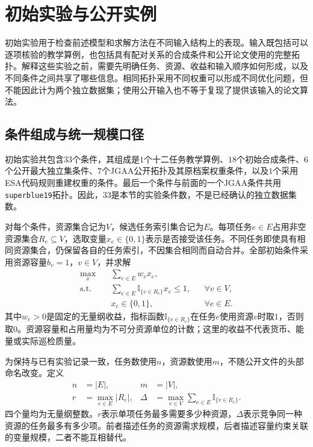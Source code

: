 \section{初始实验与公开实例}
\label{sec:03_05}

初始实验用于检查前述模型和求解方法在不同输入结构上的表现。输入既包括可以逐项核验的教学算例，也包括具有配对关系的合成条件和公开论文使用的完整拓扑。解释这些实验之前，需要先明确任务、资源、收益和输入顺序如何形成，以及不同条件之间共享了哪些信息。相同拓扑采用不同权重可以形成不同优化问题，但不能因此计为两个独立数据集；使用公开输入也不等于复现了提供该输入的论文算法。

\subsection{条件组成与统一规模口径}

初始实验共包含$33$个条件，其组成是$1$个十二任务教学算例、$18$个初始合成条件、$6$个公开最大独立集条件、$7$个JGAA公开拓扑及其原档案权重条件，以及$1$个采用ESA代码规则重建权重的条件。最后一个条件与前面的一个JGAA条件共用\texttt{superblue19}拓扑。因此，$33$是本节的实验条件数，不是已经确认的独立数据集数。

对每个条件，资源集合记为$V$，候选任务索引集合记为$E$。每项任务$e\in E$占用非空资源集合$R_e\subseteq V$，选取变量$x_e\in\{0,1\}$表示是否接受该任务。不同任务即使具有相同资源集合，仍保留各自的任务索引，不因集合相同而自动合并。全部初始条件采用资源容量$b_v=1$，$v\in V$，并求解
\begin{equation}
 \begin{aligned}
 \max_{x}\quad &\sum_{e\in E}w_ex_e,\\
 \text{s.t.}\quad &\sum_{e\in E}\mathbb{I}_{\{v\in R_e\}}x_e\leq1,
 &&\forall v\in V,\\
 &x_e\in\{0,1\},&&\forall e\in E.
 \end{aligned}
 \label{s0305:common_model}
\end{equation}
其中$w_e>0$是固定的无量纲收益，指标函数$\mathbb{I}_{\{v\in R_e\}}$在任务$e$使用资源$v$时取$1$，否则取$0$。资源容量和占用量均为不可分资源单位的计数；这里的收益不代表货币、能量或实际巡检质量。

为保持与已有实验记录一致，任务数使用$n$，资源数使用$m$，不随公开文件的头部命名改变。定义
\begin{align}
 n&=|E|, &m&=|V|,\label{s0305:sizes}\\
 r&=\max_{e\in E}|R_e|,
 &\Delta&=\max_{v\in V}\sum_{e\in E}\mathbb{I}_{\{v\in R_e\}}.
 \label{s0305:rank_degree}
\end{align}
四个量均为无量纲整数。$r$表示单项任务最多需要多少种资源，$\Delta$表示竞争同一种资源的任务最多有多少项。前者描述任务的资源需求规模，后者描述容量约束关联的变量规模，二者不能互相替代。

